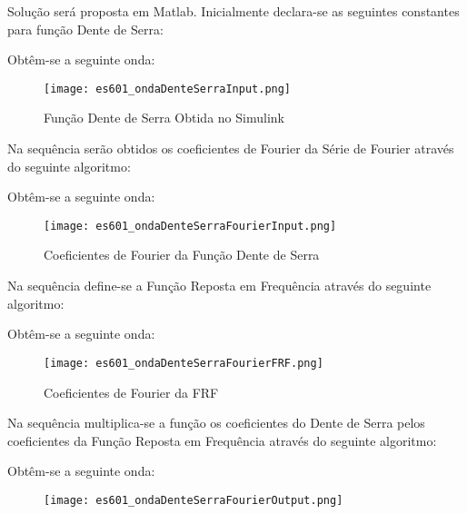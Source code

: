 \documentclass{article}
\begin{document}
\newpage
    \begin{resolution}
        Solução será proposta em Matlab. Inicialmente declara-se as seguintes constantes para função Dente de Serra:
        \begin{scriptsize}
            \myOctave
        \end{scriptsize}
        Obtêm-se a seguinte onda:
        \begin{figure}[H]
            \centering
            \texttt{[image: es601\_ondaDenteSerraInput.png]}
            \caption{Função Dente de Serra Obtida no Simulink}
        \end{figure}
\newpage
        Na sequência serão obtidos os coeficientes de Fourier da Série de Fourier através do seguinte algoritmo:
        \begin{scriptsize}
            \myOctave
        \end{scriptsize}
        Obtêm-se a seguinte onda:
        \begin{figure}[H]
            \centering
            \texttt{[image: es601\_ondaDenteSerraFourierInput.png]}
            \caption{Coeficientes de Fourier da Função Dente de Serra}
        \end{figure}
\newpage
        Na sequência define-se a Função Reposta em Frequência através do seguinte algoritmo:
        \begin{scriptsize}
            \myOctave
        \end{scriptsize}
        Obtêm-se a seguinte onda:
        \begin{figure}[H]
            \centering
            \texttt{[image: es601\_ondaDenteSerraFourierFRF.png]}
            \caption{Coeficientes de Fourier da FRF}
        \end{figure}
\newpage
        Na sequência multiplica-se a função os coeficientes do Dente de Serra pelos coeficientes da Função Reposta em Frequência através do seguinte algoritmo:
        \begin{scriptsize}
            \myOctave
        \end{scriptsize}
        Obtêm-se a seguinte onda:
        \begin{figure}[H]
            \centering
            \texttt{[image: es601\_ondaDenteSerraFourierOutput.png]}

\end{figure}
\end{resolution}
\end{document}
